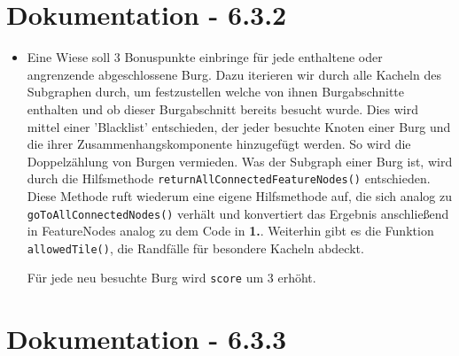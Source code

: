 \clearpage

\section{Dokumentation - 6.3.2}

\begin{itemize}
\item[]
	Eine Wiese soll 3 Bonuspunkte einbringe für jede enthaltene oder angrenzende abgeschlossene Burg.
	Dazu iterieren wir durch alle Kacheln des Subgraphen durch, um festzustellen welche von ihnen Burgabschnitte enthalten und ob dieser Burgabschnitt bereits besucht wurde. Dies wird mittel einer 'Blacklist' entschieden, der jeder besuchte 
	Knoten einer Burg und die ihrer Zusammenhangskomponente hinzugefügt werden. So wird die Doppelz\"ahlung von Burgen vermieden. Was der Subgraph einer Burg ist, wird durch die Hilfsmethode \texttt{returnAllConnectedFeatureNodes()} 
	entschieden. Diese Methode ruft wiederum eine eigene Hilfsmethode auf, die sich analog zu \texttt{goToAllConnectedNodes()} verhält und konvertiert das Ergebnis anschließend in FeatureNodes analog zu dem Code in \textbf{1.}. Weiterhin 
	gibt es die Funktion \texttt{allowedTile()}, die Randfälle für besondere Kacheln abdeckt.

	Für jede neu besuchte Burg wird \texttt{score} um 3 erhöht.
\end{itemize}

\clearpage

\section{Dokumentation - 6.3.3}

